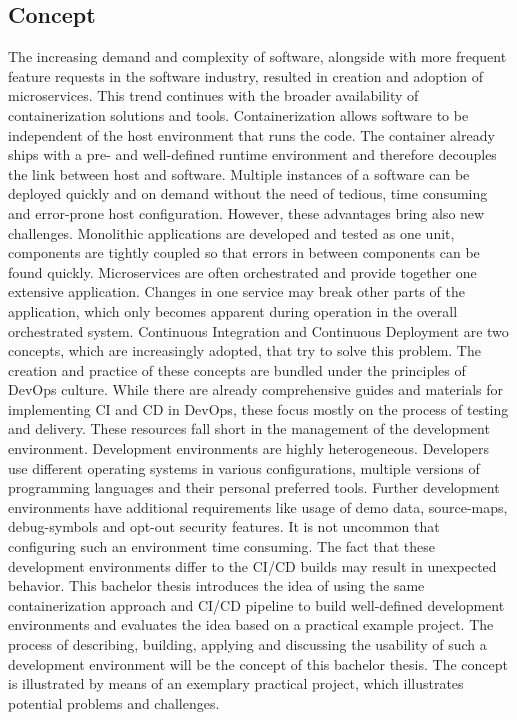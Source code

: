 \documentclass[12pt, a4paper]{article}
\begin{document}
\subsection{Concept}
The increasing demand and complexity of software, alongside with more frequent feature requests in the software industry, resulted in creation and adoption of microservices. This trend continues with the broader availability of containerization solutions and tools. Containerization allows software to be independent of the host environment that runs the code. The container already ships with a pre- and well-defined runtime environment and therefore decouples the link between host and software. Multiple instances of a software can be deployed quickly and on demand without the need of tedious, time consuming and error-prone host configuration. However, these advantages bring also new challenges. Monolithic applications are developed and tested as one unit, components are tightly coupled so that errors in between components can be found quickly. Microservices are often orchestrated and provide together one extensive application. Changes in one service may break other parts of the application, which only becomes apparent during operation in the overall orchestrated system. Continuous Integration and Continuous Deployment are two concepts, which are increasingly adopted, that try to solve this problem. The creation and practice of these concepts are bundled under the principles of DevOps culture. While there are already comprehensive guides and materials for implementing \ac{CI} and \ac{CD} in DevOps, these focus mostly on the process of testing and delivery. These resources fall short in the management of the development environment.\newline
Development environments are highly heterogeneous. Developers use different operating systems in various configurations, multiple versions of programming languages and their personal preferred tools. Further development environments have additional requirements like usage of demo data, source-maps, debug-symbols and opt-out security features. It is not uncommon that configuring such an environment time consuming. The fact that these development environments differ to the \ac{CI}/\ac{CD} builds may result in unexpected behavior. This bachelor thesis introduces the idea of using the same containerization approach and \ac{CI}/\ac{CD} pipeline to build well-defined development environments and evaluates the idea based on a practical example project.\newline
The process of describing, building, applying and discussing the usability of such a development environment will be the concept of this bachelor thesis. The concept is illustrated by means of an exemplary practical project, which illustrates potential problems and challenges.
\end{document}
